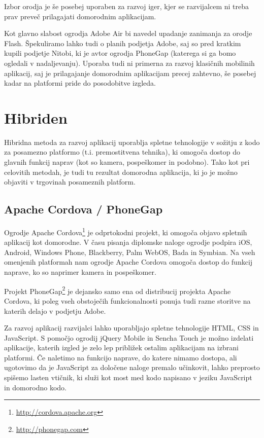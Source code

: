 Izbor orodja je še posebej uporaben za razvoj iger, kjer se razvijalcem ni treba prav preveč prilagajati domorodnim aplikacijam.

Kot glavno slabost ogrodja Adobe Air bi navedel upadanje zanimanja za orodje Flash. Špekuliramo lahko tudi o planih podjetja Adobe, saj so pred kratkim kupili podjetje Nitobi, ki je avtor ogrodja PhoneGap (katerega si ga bomo ogledali v nadaljevanju). Uporaba tudi ni primerna za razvoj klasičnih mobilinih aplikacij, saj je prilagajanje domorodnim aplikacijam precej zahtevno, še posebej kadar na platformi pride do posodobitve izgleda.

\section{Hibriden}

Hibridna metoda za razvoj aplikacij uporablja spletne tehnologije v sožitju z kodo za posamezno platformo (t.i. premostitvena tehnika), ki omogoča dostop do glavnih funkcij naprav (kot so kamera, pospeškomer in podobno). Tako kot pri celovitih metodah, je tudi tu rezultat domorodna aplikacija, ki jo je možno objaviti v trgovinah posameznih platform.

\subsection{Apache Cordova / PhoneGap}

Ogrodje Apache Cordova\footnote{\href{http://cordova.apache.org}{http://cordova.apache.org}} je odprtokodni projekt, ki omogoča objavo spletnih aplikacij kot domorodne. V času pisanja diplomske naloge ogrodje podpira iOS, Android, Windows Phone, Blackberry, Palm WebOS, Bada in Symbian. Na vseh omenjenih platformah nam ogrodje Apache Cordova omogoča dostop do funkcij naprave, ko so naprimer kamera in pospeškomer.

Projekt PhoneGap\footnote{\href{http://phonegap.com}{http://phonegap.com}} je dejansko samo ena od distribucij projekta Apache Cordova, ki poleg vseh obstoječih funkcionalnosti ponuja tudi razne storitve na katerih delajo v podjetju Adobe.

Za razvoj aplikacij razvijalci lahko uporabljajo spletne tehnologije HTML, CSS in JavaScript. S pomočjo ogrodij jQuery Mobile in Sencha Touch je možno izdelati aplikacije, katerih izgled je zelo lep približek ostalim aplikacijam na izbrani platformi. Če naletimo na funkcijo naprave, do katere nimamo dostopa, ali ugotovimo da je JavaScript za določene naloge premalo učinkovit, lahko preprosto spišemo lasten vtičnik, ki služi kot most med kodo napisano v jeziku JavaScript in domorodno kodo.

